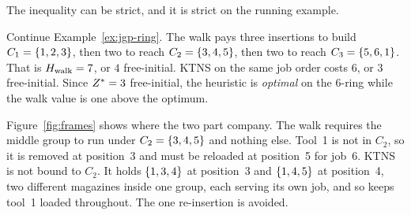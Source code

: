 The inequality can be strict, and it is strict on the running example.

\begin{example}\label{ex:frames-ring}
Continue Example~\ref{ex:jgp-ring}. The walk pays three insertions to build
$C_1=\{1,2,3\}$, then two to reach $C_2=\{3,4,5\}$, then two to reach
$C_3=\{5,6,1\}$. That is $H_{\mathrm{walk}}=7$, or $4$ free-initial. KTNS on the same job
order costs $6$, or $3$ free-initial. Since $Z^{\ast}=3$ free-initial, the heuristic is
\emph{optimal} on the $6$-ring while the walk value is one above the optimum.

Figure~\ref{fig:frames} shows where the two part company. The walk requires the
middle group to run under $C_2=\{3,4,5\}$ and nothing else. Tool~1 is not in
$C_2$, so it is removed at position~3 and must be reloaded at position~5 for job~6.
KTNS is not bound to $C_2$. It holds $\{1,3,4\}$ at position~3 and
$\{1,4,5\}$ at position~4, two different magazines inside one group, each
serving its own job, and so keeps tool~1 loaded throughout. The one re-insertion is
avoided.
\end{example}

